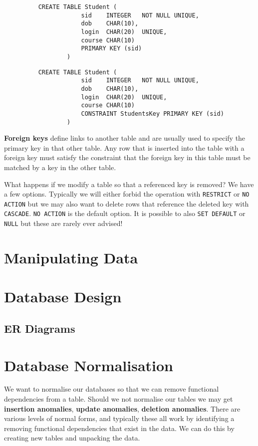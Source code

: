 \documentclass{article}
\begin{document}
	\begin{figure}[h]
		\begin{minipage}[t]{0.45\textwidth}
			\begin{verbatim}
	CREATE TABLE Student (
			    sid    INTEGER   NOT NULL UNIQUE,
			    dob    CHAR(10),
			    login  CHAR(20)  UNIQUE,
			    course CHAR(10)
			    PRIMARY KEY (sid)
			)
	\end{verbatim}
		\end{minipage}
		\hfill
		\begin{minipage}[t]{0.45\textwidth}
			\begin{verbatim}
	CREATE TABLE Student (
			    sid    INTEGER   NOT NULL UNIQUE,
			    dob    CHAR(10),
			    login  CHAR(20)  UNIQUE,
			    course CHAR(10)
			    CONSTRAINT StudentsKey PRIMARY KEY (sid)
			)
	\end{verbatim}
		\end{minipage}
	\end{figure}
	
	
	\par 
	\textbf{Foreign keys} define links to another table and are usually used to specify the primary key in that other table. Any row that is inserted into the table with a foreign key must satisfy the constraint that the foreign key in this table must be matched by a key in the other table.
	
	\par 
	What happens if we modify a table so that a referenced key is removed? We have a few options. Typically we will either forbid the operation with \texttt{RESTRICT} or \texttt{NO ACTION} but we may also want to delete rows that reference the deleted key with \texttt{CASCADE}. \texttt{NO ACTION} is the default option. It is possible to also \texttt{SET DEFAULT} or \texttt{NULL} but these are rarely ever advised! 
	
	\section{Manipulating Data}	
	
	\section{Database Design}
	\subsection{ER Diagrams}
	
	\section{Database Normalisation}
	We want to normalise our databases so that we can remove functional dependencies from a table. Should we not normalise our tables we may get \textbf{insertion anomalies}, \textbf{update anomalies}, \textbf{deletion anomalies}. There are various levels of normal forms, and typically these all work by identifying a removing functional dependencies that exist in the data. We can do this by creating new tables and unpacking the data.
	
\end{document}
